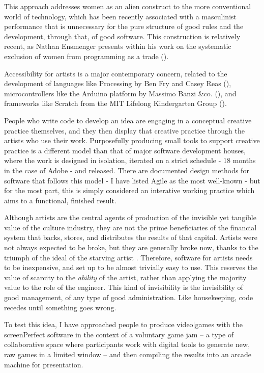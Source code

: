 This approach addresses women as an alien construct to the more conventional world of technology, which has been recently associated with a masculinist performance that is unnecessary for the pure structure of good rules and the development, through that, of good software. This construction is relatively recent, as Nathan Ensmenger presents within his work on the systematic exclusion of women from programming as a trade (\cite{ensmenger}).

Accessibility for artists is a major contemporary concern, related to the development of languages like Processing by Ben Fry and Casey Reas (\cite{processing}), microcontrollers like the Arduino platform by Massimo Banzi &co. (\cite{arduino}), and frameworks like Scratch from the MIT Lifelong Kindergarten Group (\cite{scratch}). 

People who write code to develop an idea are engaging in a conceptual creative practice themselves, and they then display that creative practice through the artists who use their work. Purposefully producing small tools to support creative practice is a different model than that of major software development houses, where the work is designed in isolation, iterated on a strict schedule - 18 months in the case of Adobe \cite{adobe} - and released. There are documented design methods for software that follows this model - I have listed Agile as the most well-known - but for the most part, this is simply considered an interative working practice which aims to a functional, finished result.

Although artists are the central agents of production of the invisible yet tangible value of the culture industry, they are not the prime beneficiaries of the financial system that backs, stores, and distributes the results of that capital. Artists were not always expected to be broke, but they are generally broke now, thanks to the triumph of the ideal of the starving artist . Therefore, software for artists needs to be inexpensive, and set up to be almost trivially easy to use. This reserves the value of scarcity to the \textit{ability} of the artist, rather than applying the majority value to the role of the engineer. This kind of invisibility is the invisibility of good management, of any type of good administration. Like housekeeping, code recedes until something goes wrong.

To test this idea, I have approached people to produce video|games with the screenPerfect software in the context of a voluntary game jam – a type of collaborative space where participants work with digital tools to generate new, raw games in a limited window – and then compiling the results into an arcade machine for presentation. 

